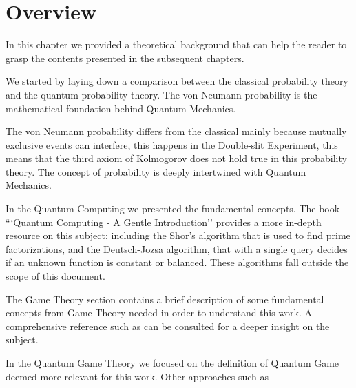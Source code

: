 \section{Overview}
\label{sec:background_overview}

In this chapter we provided a theoretical background that can help the reader to grasp the contents presented in the subsequent chapters.

We started by laying down a comparison between the classical probability theory and the quantum probability theory. The von Neumann probability is the mathematical foundation behind Quantum Mechanics. 

The von Neumann probability differs from the classical mainly because mutually exclusive events can interfere, this happens in the Double-slit Experiment, this means that the third axiom of Kolmogorov does not hold true in this probability theory. The concept of probability is deeply intertwined with Quantum Mechanics. 

In the Quantum Computing we presented the fundamental concepts. The book ```Quantum Computing - A Gentle Introduction''\cite{Rieffel2011} provides a more in-depth resource on this subject; including the Shor's algorithm that is used to find prime factorizations, and the Deutsch-Jozsa algorithm, that with a single query decides if an unknown function is constant or balanced. These algorithms fall outside the scope of this document.

The Game Theory section contains a brief description of some fundamental concepts from Game Theory needed in order to understand this work. A comprehensive reference such as \cite{Osborne2004} can be consulted for a deeper insight on the subject.

In the Quantum Game Theory we focused on the definition of Quantum Game deemed more relevant for this work. Other approaches such as 


